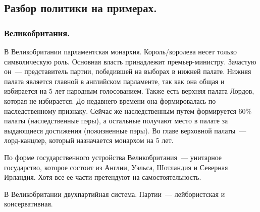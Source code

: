 \documentclass[12pt]{article}
\begin{document}
	\subsection{Разбор политики на примерах.}
	\subsubsection{Великобритания.}
	\begin{note}
		В Великобритании парламентская монархия. Король/королева несет только символическую роль. Основная власть принадлежит премьер-министру. Зачастую он~--- представитель партии, победившей на выборах в нижней палате. Нижняя палата является главной в английском парламенте, так как она общая и избирается на $5$ лет народным голосованием. Также есть верхняя палата Лордов, которая не избирается. До недавнего времени она формировалась по наследственному признаку. Сейчас же наследственным путем формируется $60\%$ палаты (наследственные пэры), а остальные получают место в палате за выдающиеся достижения (пожизненные пэры). Во главе верховной палаты~--- лорд-канцлер, который назначается монархом на 5 лет.
	\end{note}
	\begin{note}
		По форме государственного устройства Великобритания~--- унитарное государство, которое состоит из Англии, Уэльса, Шотландия и Северная Ирландия. Хотя все ее части претендуют на самостоятельность.
	\end{note}
	\begin{note}
		В Великобритании двухпартийная система. Партии~--- лейбористская и консервативная.
	\end{note}
\end{document}
